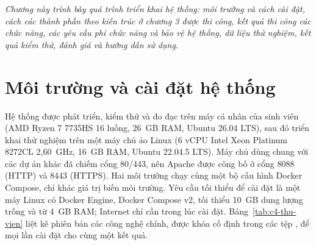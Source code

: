 \documentclass[../main.tex]{subfiles}
\begin{document}
\textit{Chương này trình bày quá trình triển khai hệ thống: môi trường và cách cài đặt, cách các thành phần theo kiến trúc ở chương 3 được thi công, kết quả thi công các chức năng, các yêu cầu phi chức năng và bảo vệ hệ thống, dữ liệu thử nghiệm, kết quả kiểm thử, đánh giá và hướng dẫn sử dụng.}

\section{Môi trường và cài đặt hệ thống}\label{sec:c4-moi-truong}

Hệ thống được phát triển, kiểm thử và đo đạc trên máy cá nhân của sinh viên (AMD Ryzen 7 7735HS 16 luồng, 26~GB RAM, Ubuntu 26.04 LTS), sau đó triển khai thử nghiệm trên một máy chủ ảo Linux (6 vCPU Intel Xeon Platinum 8272CL 2,60~GHz, 16~GB RAM, Ubuntu 22.04.5 LTS). Máy chủ dùng chung với các dự án khác đã chiếm cổng 80/443, nên Apache được công bố ở cổng 8088 (HTTP) và 8443 (HTTPS). Hai môi trường chạy cùng một bộ cấu hình Docker Compose, chỉ khác giá trị biến môi trường. Yêu cầu tối thiểu để cài đặt là một máy Linux có Docker Engine, Docker Compose v2, tối thiểu 10~GB dung lượng trống và từ 4~GB RAM; Internet chỉ cần trong lúc cài đặt. Bảng~\ref{tab:c4-thu-vien} liệt kê phiên bản các công nghệ chính, được khóa cố định trong các tệp ,  để mọi lần cài đặt cho cùng một kết quả.
\end{document}
